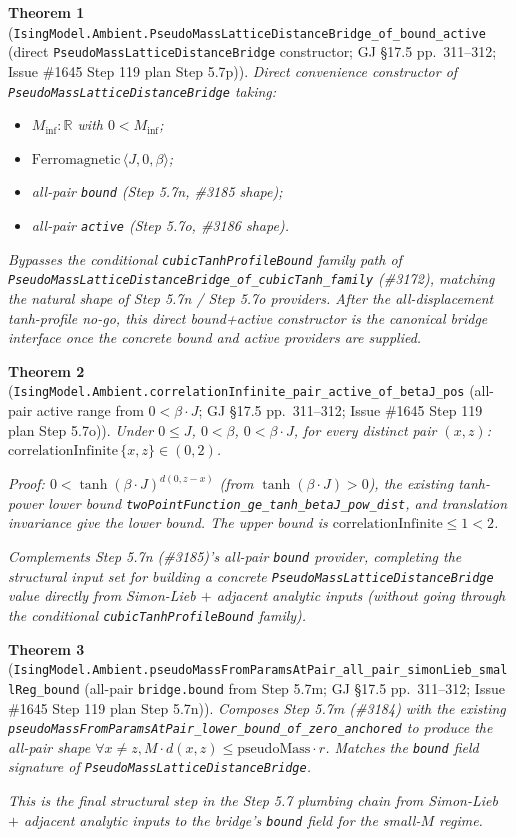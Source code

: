 \documentclass[a4paper,11pt]{article}
\newtheorem{theorem}{Theorem}
\begin{document}
\begin{theorem}[\texttt{IsingModel.Ambient.PseudoMassLatticeDistanceBridge\_of\_bound\_active}
(direct \texttt{PseudoMassLatticeDistanceBridge} constructor;
GJ \S17.5 pp.~311--312; Issue \#1645 Step 119 plan Step 5.7p)]
Direct convenience constructor of
\texttt{PseudoMassLatticeDistanceBridge} taking:
\begin{itemize}
  \item $M_{\inf} : \mathbb{R}$ with $0 < M_{\inf}$;
  \item $\mathrm{Ferromagnetic}\,\langle J, 0, \beta\rangle$;
  \item all-pair \texttt{bound} (Step 5.7n, \#3185 shape);
  \item all-pair \texttt{active} (Step 5.7o, \#3186 shape).
\end{itemize}
Bypasses the conditional \texttt{cubicTanhProfileBound} family path of
\texttt{PseudoMassLatticeDistanceBridge\_of\_cubicTanh\_family} (\#3172),
matching the natural shape of Step 5.7n / Step 5.7o providers.  After the
all-displacement tanh-profile no-go, this direct bound+active constructor is
the canonical bridge interface once the concrete bound and active providers are
supplied.
\end{theorem}

\begin{theorem}[\texttt{IsingModel.Ambient.correlationInfinite\_pair\_active\_of\_betaJ\_pos}
(all-pair active range from $0 < \beta\cdot J$;
GJ \S17.5 pp.~311--312; Issue \#1645 Step 119 plan Step 5.7o)]
Under $0 \le J$, $0 < \beta$, $0 < \beta\cdot J$, for every distinct pair
$(x, z)$:
$\mathrm{correlationInfinite}\,\{x, z\} \in (0, 2)$.

Proof: $0 < \tanh(\beta\cdot J)^{d(0, z - x)}$ (from $\tanh(\beta\cdot J) > 0$),
the existing tanh-power lower bound
\texttt{twoPointFunction\_ge\_tanh\_betaJ\_pow\_dist}, and translation
invariance give the lower bound. The upper bound is
$\mathrm{correlationInfinite} \le 1 < 2$.

Complements Step 5.7n (\#3185)'s all-pair \texttt{bound} provider,
completing the structural input set for building a concrete
\texttt{PseudoMassLatticeDistanceBridge} value directly from Simon-Lieb
$+$ adjacent analytic inputs (without going through the conditional
\texttt{cubicTanhProfileBound} family).
\end{theorem}

\begin{theorem}[\texttt{IsingModel.Ambient.pseudoMassFromParamsAtPair\_all\_pair\_simonLieb\_smallReg\_bound}
(all-pair \texttt{bridge.bound} from Step 5.7m;
GJ \S17.5 pp.~311--312; Issue \#1645 Step 119 plan Step 5.7n)]
Composes Step 5.7m (\#3184) with the existing
\texttt{pseudoMassFromParamsAtPair\_lower\_bound\_of\_zero\_anchored} to
produce the all-pair shape
$\forall x \ne z, M \cdot d(x, z) \le \mathrm{pseudoMass} \cdot r$.
Matches the \texttt{bound} field signature of
\texttt{PseudoMassLatticeDistanceBridge}.

This is the final structural step in the Step 5.7 plumbing chain from
Simon-Lieb $+$ adjacent analytic inputs to the bridge's \texttt{bound}
field for the small-$M$ regime.
\end{theorem}
\end{document}
